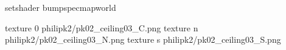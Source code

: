 setshader bumpspecmapworld

texture 0 philipk2/pk02_ceiling03_C.png
texture n philipk2/pk02_ceiling03_N.png
texture s philipk2/pk02_ceiling03_S.png

